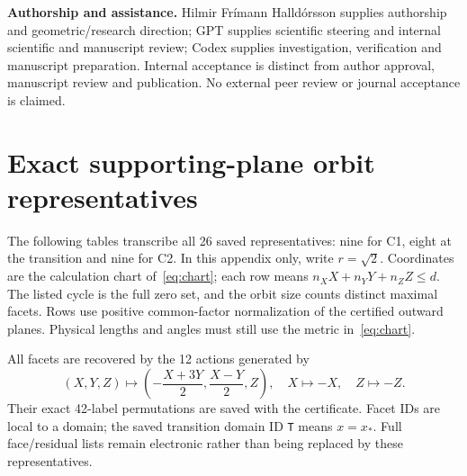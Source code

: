 \documentclass[11pt,a4paper]{article}
\newcommand{\xs}{x_*}
\theoremstyle{definition}
\begin{document}
\textbf{Authorship and assistance.} Hilmir Frímann Halldórsson supplies authorship and geometric/research direction; GPT supplies scientific steering and internal scientific and manuscript review; Codex supplies investigation, verification and manuscript preparation. Internal acceptance is distinct from author approval, manuscript review and publication. No external peer review or journal acceptance is claimed.



\clearpage\appendix
\section{Exact supporting-plane orbit representatives}\label{app:planes}
The following tables transcribe all 26 saved representatives: nine for C1, eight at the transition and nine for C2. In this appendix only, write $r=\sqrt2$. Coordinates are the calculation chart of~\eqref{eq:chart}; each row means $n_X X+n_Y Y+n_Z Z\le d$. The listed cycle is the full zero set, and the orbit size counts distinct maximal facets. Rows use positive common-factor normalization of the certified outward planes. Physical lengths and angles must still use the metric in~\eqref{eq:chart}.

All facets are recovered by the 12 actions generated by
\begin{equation}\label{eq:group}
(X,Y,Z)\mapsto\left(-\frac{X+3Y}{2},\frac{X-Y}{2},Z\right),
\quad X\mapsto-X,\quad Z\mapsto-Z.
\end{equation}
Their exact 42-label permutations are saved with the certificate. Facet IDs are local to a domain; the saved transition domain ID \texttt{T} means $x=\xs$. Full face/residual lists remain electronic rather than being replaced by these representatives.


\clearpage

\end{document}
